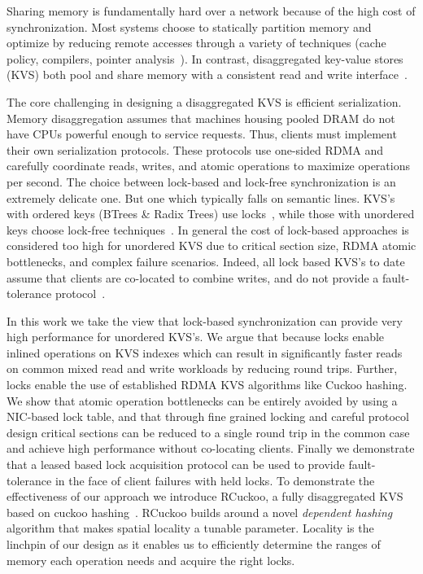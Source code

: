 Sharing memory is fundamentally hard over a network because of the high cost of synchronization.
Most systems choose to statically partition memory and optimize by reducing remote accesses through
a variety of techniques (cache policy, compilers, pointer
analysis~\cite{kona,mira,aifm,trackfm,carbink}). In contrast, disaggregated key-value stores (KVS) both
pool and share memory with a consistent read and write
interface~\cite{rolex,smart,ditto,fusee,clover,sherman,ford}.

The core challenging in designing a disaggregated KVS is efficient serialization. Memory
disaggregation assumes that machines housing pooled DRAM do not have CPUs powerful enough to service
requests. Thus, clients must implement their own serialization protocols. These protocols use
one-sided RDMA and carefully coordinate reads, writes, and atomic operations to maximize operations
per second.  The choice between lock-based and lock-free synchronization is an extremely delicate
one. But one which typically falls on semantic lines. KVS's with ordered keys (BTrees \& Radix
Trees) use locks~\cite{sherman,smart}, while those with unordered keys choose lock-free
techniques~\cite{rolex,ditto,fusee,clover}. In general the cost of lock-based approaches is
considered too high for unordered KVS due to critical section size, RDMA atomic bottlenecks, and
complex failure scenarios. Indeed, all lock based KVS's to date assume that clients are co-located
to combine writes, and do not provide a fault-tolerance protocol~\cite{sherman,smart}.

In this work we take the view that lock-based synchronization can provide very high performance for
unordered KVS's. We argue that because locks enable inlined operations on KVS indexes which can
result in significantly faster reads on common mixed read and write workloads by reducing round
trips. Further, locks enable the use of established RDMA KVS algorithms like Cuckoo hashing. We show
that atomic operation bottlenecks can be entirely avoided by using a NIC-based lock table, and that
through fine grained locking and careful protocol design critical sections can be reduced to a
single round trip in the common case and achieve high performance without co-locating clients.
Finally we demonstrate that a leased based lock acquisition protocol can be used to provide
fault-tolerance in the face of client failures with held locks.  To demonstrate the effectiveness of
our approach we introduce RCuckoo, a fully disaggregated KVS based on cuckoo hashing~\cite{cuckoo}.
RCuckoo builds around a novel \emph{dependent hashing} algorithm that makes spatial locality a
tunable parameter. Locality is the linchpin of our design as it enables us to efficiently determine
the ranges of memory each operation needs and acquire the right locks.



